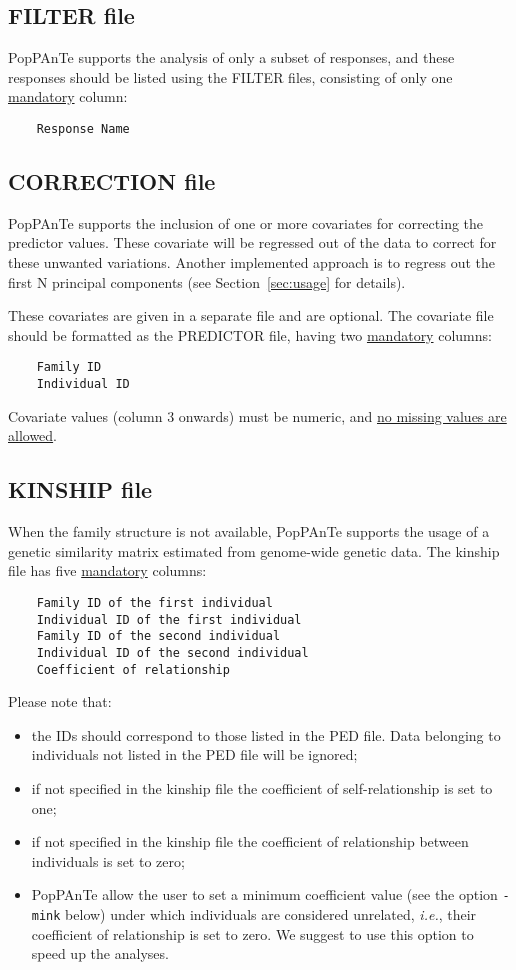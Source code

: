 \documentclass[a4paper,9pt]{article}
\newcommand{\minusitem}{\item[-]}
\begin{document}
\subsection{FILTER file}
PopPAnTe supports the analysis of only a subset of responses, and these responses should be listed using the FILTER files, consisting of only one \underline{mandatory} column:

\begin{Verbatim}
	Response Name
\end{Verbatim}


\subsection{CORRECTION file}
PopPAnTe supports the inclusion of one or more covariates for correcting the predictor values. These covariate will be regressed out of the data to correct for these unwanted variations. Another implemented approach is to regress out the first N principal components (see Section~\ref{sec:usage} for details).

\noindent
These covariates are given in a separate file and are optional. The covariate file should be formatted as the PREDICTOR file, having two \underline{mandatory} columns:

\begin{Verbatim}
	Family ID
	Individual ID
\end{Verbatim}

\noindent
Covariate values (column 3 onwards) must be numeric, and \underline{no missing values are allowed}.

\newpage

\subsection{KINSHIP file}
When the family structure is not available, PopPAnTe supports the usage of a genetic similarity matrix estimated from genome-wide genetic data. The kinship file has five \underline{mandatory} columns:

\begin{Verbatim}
	Family ID of the first individual
	Individual ID of the first individual
	Family ID of the second individual
	Individual ID of the second individual
	Coefficient of relationship
\end{Verbatim}

\noindent
Please note that:
\begin{itemize}
	\setlength{\itemsep}{-3pt}
	\minusitem the IDs should correspond to those listed in the PED file. Data belonging to individuals not listed in the PED file will be ignored;
	\minusitem if not specified in the kinship file the coefficient of self-relationship is set to one;
	\minusitem if not specified in the kinship file the coefficient of relationship between individuals is set to zero;
	\minusitem PopPAnTe allow the user to set a minimum coefficient value (see the option \texttt{-mink} below) under which individuals are considered unrelated, \emph{i.e.}, their coefficient of relationship is set to zero. We suggest to use this option to speed up the analyses.
\end{itemize}
\end{document}
